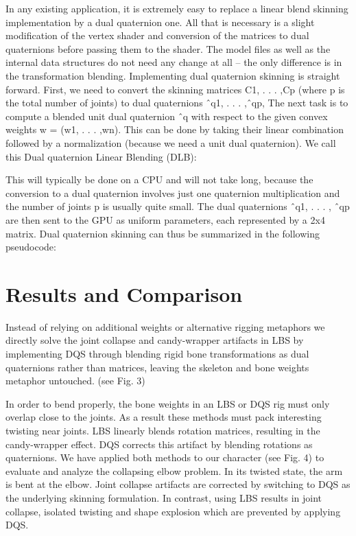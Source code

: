 \documentclass[annual]{styles/acmsiggraph}
\begin{document}
In any existing application, it is extremely easy to replace a linear blend skinning implementation by a dual quaternion one. All that is necessary is a slight modification of the vertex shader and conversion of the matrices to dual quaternions before passing them to the shader. The model files as well as the internal data structures do not need any change at all – the only difference is in the transformation blending.
Implementing dual quaternion skinning is straight forward. First, we need to convert the skinning matrices C1, . . . ,Cp (where p is the total number of joints) to dual quaternions ˆq1, . . . ,ˆqp, The next task is to compute a blended unit dual quaternion ˆq with respect to the given convex weights w = (w1, . . . ,wn). This can be done by taking their linear combination followed by a normalization (because we need a unit dual quaternion). We call this Dual quaternion Linear Blending (DLB):

This will typically be done on a CPU and will not take long, because the conversion to a dual quaternion involves just one quaternion multiplication and the number of joints p is usually quite small. The dual quaternions ˆq1, . . . , ˆqp are then sent to the GPU as uniform parameters, each represented by a 2x4 matrix. Dual quaternion skinning can thus be summarized in the following pseudocode:

\section{Results and Comparison}
Instead of relying on additional weights or alternative rigging metaphors we directly solve the joint collapse and candy-wrapper artifacts in LBS by implementing DQS through blending rigid bone transformations as dual quaternions rather than matrices, leaving the skeleton and bone weights metaphor untouched. (see Fig. 3)

In order to bend properly, the bone weights in an LBS or DQS rig must only overlap close to the joints. As a result these methods must pack interesting twisting near joints. LBS linearly blends rotation matrices, resulting in the candy-wrapper effect. DQS corrects this artifact by blending rotations as quaternions. We have applied both methods to our character (see Fig. 4) to evaluate and analyze the collapsing elbow problem. In its twisted state, the arm is bent at the elbow. Joint collapse artifacts are corrected by switching to DQS as the underlying skinning formulation. In contrast, using LBS results in joint collapse, isolated twisting and shape explosion which are prevented by applying DQS.
\end{document}
